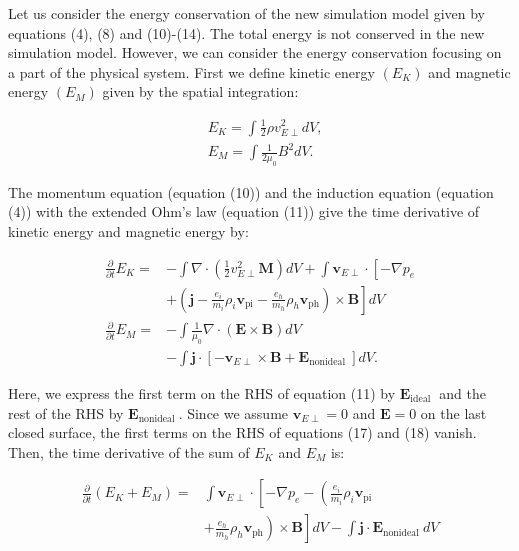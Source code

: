 \documentclass[10pt]{article}
\begin{document}
Let us consider the energy conservation of the new simulation model given by equations (4), (8) and (10)-(14). The total energy is not conserved in the new simulation model. However, we can consider the energy conservation focusing on a part of the physical system. First we define kinetic energy $\left(E_{K}\right)$ and magnetic energy $\left(E_{M}\right)$ given by the spatial integration:

$$
\begin{aligned}
& E_{K}=\int \frac{1}{2} \rho v_{E \perp}^{2} d V, \\
& E_{M}=\int \frac{1}{2 \mu_{0}} B^{2} d V .
\end{aligned}
$$

The momentum equation (equation (10)) and the induction equation (equation (4)) with the extended Ohm's law (equation (11)) give the time derivative of kinetic energy and magnetic energy by:

$$
\begin{aligned}
\frac{\partial}{\partial t} E_{K}= & -\int \nabla \cdot\left(\frac{1}{2} v_{E \perp}^{2} \mathbf{M}\right) d V+\int \mathbf{v}_{E \perp} \cdot\left[-\nabla p_{e}\right. \\
& \left.+\left(\mathbf{j}-\frac{e_{i}}{m_{i}} \rho_{i} \mathbf{v}_{\mathrm{pi}}-\frac{e_{h}}{m_{h}} \rho_{h} \mathbf{v}_{\mathrm{ph}}\right) \times \mathbf{B}\right] d V \\
\frac{\partial}{\partial t} E_{M}= & -\int \frac{1}{\mu_{0}} \nabla \cdot(\mathbf{E} \times \mathbf{B}) d V \\
& -\int \mathbf{j} \cdot\left[-\mathbf{v}_{E \perp} \times \mathbf{B}+\mathbf{E}_{\text {nonideal }}\right] d V .
\end{aligned}
$$

Here, we express the first term on the RHS of equation (11) by $\mathbf{E}_{\text {ideal }}$ and the rest of the RHS by $\mathbf{E}_{\text {nonideal }}$. Since we assume $\mathbf{v}_{E \perp}=0$ and $\mathbf{E}=0$ on the last closed surface, the first terms on the RHS of equations (17) and (18) vanish. Then, the time derivative of the sum of $E_{K}$ and $E_{M}$ is:

$$
\begin{aligned}
\frac{\partial}{\partial t}\left(E_{K}+E_{M}\right)= & \int \mathbf{v}_{E \perp} \cdot\left[-\nabla p_{e}-\left(\frac{e_{i}}{m_{i}} \rho_{i} \mathbf{v}_{\mathrm{pi}}\right.\right. \\
& \left.\left.+\frac{e_{h}}{m_{h}} \rho_{h} \mathbf{v}_{\mathrm{ph}}\right) \times \mathbf{B}\right] d V-\int \mathbf{j} \cdot \mathbf{E}_{\text {nonideal }} d V
\end{aligned}
$$
\end{document}
